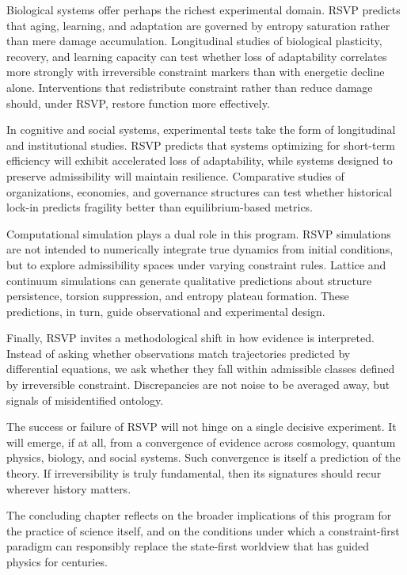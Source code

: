 \documentclass[11pt,oneside]{book}
\begin{document}
Biological systems offer perhaps the richest experimental domain. RSVP predicts that aging, learning, and adaptation are governed by entropy saturation rather than mere damage accumulation. Longitudinal studies of biological plasticity, recovery, and learning capacity can test whether loss of adaptability correlates more strongly with irreversible constraint markers than with energetic decline alone. Interventions that redistribute constraint rather than reduce damage should, under RSVP, restore function more effectively.

In cognitive and social systems, experimental tests take the form of longitudinal and institutional studies. RSVP predicts that systems optimizing for short-term efficiency will exhibit accelerated loss of adaptability, while systems designed to preserve admissibility will maintain resilience. Comparative studies of organizations, economies, and governance structures can test whether historical lock-in predicts fragility better than equilibrium-based metrics.

Computational simulation plays a dual role in this program. RSVP simulations are not intended to numerically integrate true dynamics from initial conditions, but to explore admissibility spaces under varying constraint rules. Lattice and continuum simulations can generate qualitative predictions about structure persistence, torsion suppression, and entropy plateau formation. These predictions, in turn, guide observational and experimental design.

Finally, RSVP invites a methodological shift in how evidence is interpreted. Instead of asking whether observations match trajectories predicted by differential equations, we ask whether they fall within admissible classes defined by irreversible constraint. Discrepancies are not noise to be averaged away, but signals of misidentified ontology.

The success or failure of RSVP will not hinge on a single decisive experiment. It will emerge, if at all, from a convergence of evidence across cosmology, quantum physics, biology, and social systems. Such convergence is itself a prediction of the theory. If irreversibility is truly fundamental, then its signatures should recur wherever history matters.

The concluding chapter reflects on the broader implications of this program for the practice of science itself, and on the conditions under which a constraint-first paradigm can responsibly replace the state-first worldview that has guided physics for centuries.
\end{document}
